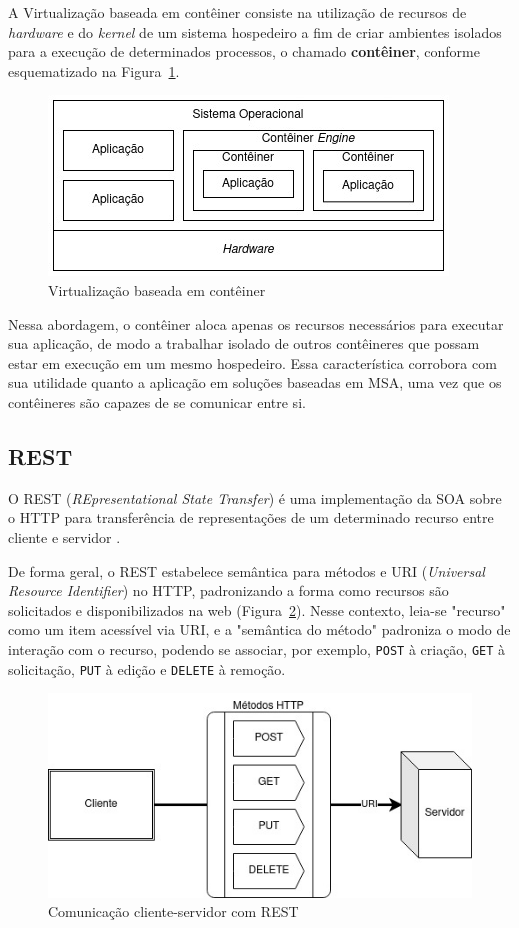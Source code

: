 \documentclass[12pt]{article}
\begin{document}
A Virtualização baseada em contêiner \cite{eder2016} consiste na utilização de recursos de \textit{hardware} e do \textit{kernel} de um sistema hospedeiro a fim de criar ambientes isolados para a execução de determinados processos, o chamado \textbf{contêiner}, conforme esquematizado na Figura~\ref{fig:conteiner}.

\begin{figure}[ht]
	\centering
	\includegraphics[width=.9\textwidth]{conteiner.jpg}
	\caption{Virtualização baseada em contêiner}
	\label{fig:conteiner}
\end{figure} 

Nessa abordagem, o contêiner aloca apenas os recursos necessários para executar sua aplicação, de modo a trabalhar isolado de outros contêineres que possam estar em execução em um mesmo hospedeiro. Essa característica corrobora com sua utilidade quanto a aplicação em soluções baseadas em MSA, uma vez que os contêineres são capazes de se comunicar entre si.

\subsection{REST}

O REST (\textit{REpresentational State Transfer}) é uma implementação da SOA sobre o HTTP para transferência de representações de um determinado recurso entre cliente e servidor \cite{mumbaikar2013}.

De forma geral, o REST estabelece semântica para métodos e URI (\textit{Universal Resource Identifier}) no HTTP, padronizando a forma como recursos são solicitados e disponibilizados na web (Figura~\ref{fig:rest}). Nesse contexto, leia-se "recurso" como um item acessível via URI, e a "semântica do método" padroniza o modo de interação com o recurso, podendo se associar, por exemplo, \texttt{POST} à criação, \texttt{GET} à solicitação, \texttt{PUT} à edição e \texttt{DELETE} à remoção\cite{adamczyk2011}.

\begin{figure}[ht]
	\centering
	\includegraphics[width=.8\textwidth]{rest.jpg}
	\caption{Comunicação cliente-servidor com REST}
	\label{fig:rest}
\end{figure} 
\end{document}
